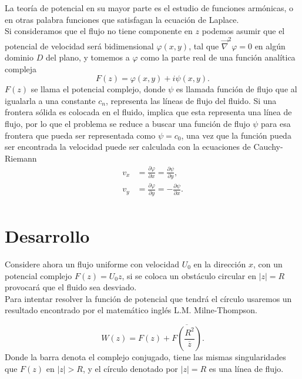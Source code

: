 \documentclass[portrait]{Hylangtechposter}
\begin{document}
\begin{multicols}{2}
 \noindent La teoría de potencial en su mayor parte es el estudio de funciones armónicas, o en otras palabra funciones que satisfagan la ecuación de Laplace.\\
 Si consideramos que el flujo no tiene componente en $z$ podemos asumir que el potencial de velocidad será bidimensional  $\varphi(x,y)$, tal que $\vec{\nabla}^2 \varphi =0 $ en algún dominio $D$ del plano, y tomemos a $\varphi$ como la parte real de una función analítica compleja
	\begin{equation}
		F(z)=\varphi (x,y)	+ i \psi(x,y).
	\end{equation}
	$F(z)$ se llama el potencial complejo, donde $\psi$ es llamada  función de flujo que al igualarla a una constante $c_n$, representa las líneas de flujo del fluido.
Si una frontera sólida es colocada en el fluido, implica que esta representa una línea de flujo, por lo que el problema se reduce  a buscar una función de flujo $\psi$ para esa frontera que pueda ser representada como $\psi=c_0$, una vez que la función pueda ser encontrada la velocidad puede ser calculada con la ecuaciones de Cauchy-Riemann
	\begin{equation}
		\begin{split}
			v_x &= \frac{\partial \varphi}{\partial x} = \frac{\partial \psi}{\partial y }, \\
			v_y &= \frac{\partial \varphi}{\partial y} =- \frac{\partial \psi}{\partial x }. \\
		\end{split}
	\end{equation}

 
\section*{Desarrollo}
\noindent Considere ahora un flujo uniforme con velocidad $U_0$ en la dirección $x$, con un potencial complejo $F(z)= U_0 z$, si se coloca un obstáculo circular en $|z| =R$ provocará que el fluido sea desviado. \\
	\noindent Para intentar resolver la función de potencial que tendrá el círculo usaremos un resultado encontrado por el matemático inglés L.M. Milne-Thompson.
		
			\begin{equation}
				W(z) = F(z) + \overline{F \left( \frac{R^2}{\overline{z} }\right)} .
				\label{Teorema_del_circulo}
			\end{equation}
			Donde la barra denota el complejo conjugado, tiene las mismas singularidades que $F(z)$ en $|z|>R $, y el círculo denotado por $|z|= R $ es una línea de flujo.
		

\end{multicols}
\end{document}

